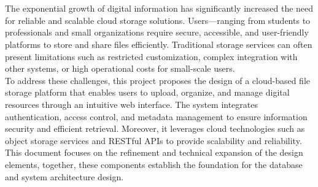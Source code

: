 \section*{}

The exponential growth of digital information has significantly increased the need for reliable and scalable cloud storage solutions. Users—ranging from students to professionals and small organizations require secure, accessible, and user-friendly platforms to store and share files efficiently. Traditional storage services can often present limitations such as restricted customization, complex integration with other systems, or high operational costs for small-scale users.\\

To address these challenges, this project proposes the design of a cloud-based file storage platform that enables users to upload, organize, and manage digital resources through an intuitive web interface. The system integrates authentication, access control, and metadata management to ensure information security and efficient retrieval. Moreover, it leverages cloud technologies such as object storage services and RESTful APIs to provide scalability and reliability.\\

This document focuses on the refinement and technical expansion of the design elements, together, these components establish the foundation for the database and system architecture design.